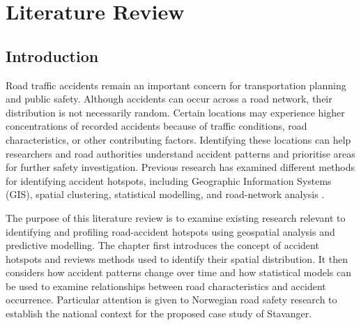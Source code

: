 \chapter{Literature Review}\label{chap:LitReview}



\section{Introduction}
\label{sec:lit-introduction}
Road traffic accidents remain an important concern for transportation planning and public safety. Although accidents can occur across a road network, their distribution is not necessarily random. Certain locations may experience higher concentrations of recorded accidents because of traffic conditions, road characteristics, or other contributing factors. Identifying these locations can help researchers and road authorities understand accident patterns and prioritise areas for further safety investigation. Previous research has examined different methods for identifying accident hotspots, including Geographic Information Systems (GIS), spatial clustering, statistical modelling, and road-network analysis \parencite{Anderson2009, AlAamri2021}.

The purpose of this literature review is to examine existing research relevant to identifying and profiling road-accident hotspots using geospatial analysis and predictive modelling. The chapter first introduces the concept of accident hotspots and reviews methods used to identify their spatial distribution. It then considers how accident patterns change over time and how statistical models can be used to examine relationships between road characteristics and accident occurrence. Particular attention is given to Norwegian road safety research to establish the national context for the proposed case study of Stavanger.

